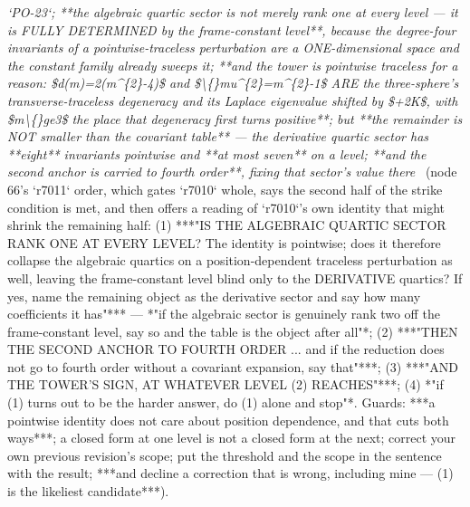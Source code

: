 \begin{description}
\textit{`PO-23`; **the algebraic quartic sector is not merely rank one at every level --- it is FULLY DETERMINED by the frame-constant level**, because the degree-four invariants of a pointwise-traceless perturbation are a ONE-dimensional space and the constant family already sweeps it;  **and the tower is pointwise traceless for a reason: \$d(m)=2(m\textasciicircum{}\{2\}-4)\$ and \$\textbackslash\{\}mu\textasciicircum{}\{2\}=m\textasciicircum{}\{2\}-1\$ ARE the three-sphere's transverse-traceless degeneracy and its Laplace eigenvalue shifted by \$+2K\$, with \$m\textbackslash\{\}ge3\$ the place that degeneracy first turns positive**;  but **the remainder is NOT smaller than the covariant table** --- the derivative quartic sector has **eight** invariants pointwise and **at most seven** on a level; **and the second anchor is carried to fourth order**, fixing that sector's value there} \ (node 66's `r7011` order, which gates `r7010` whole, says the second half of the strike condition is met, and then offers a reading of `r7010`'s own identity that might shrink the remaining half: (1) ***"IS THE ALGEBRAIC QUARTIC SECTOR RANK ONE AT EVERY LEVEL? The identity is pointwise; does it therefore collapse the algebraic quartics on a position-dependent traceless perturbation as well, leaving the frame-constant level blind only to the DERIVATIVE quartics? If yes, name the remaining object as the derivative sector and say how many coefficients it has"*** ---  *"if the algebraic sector is genuinely rank two off the frame-constant level, say so and the table is the object after all"*; (2) ***"THEN THE SECOND ANCHOR TO FOURTH ORDER ... and if the reduction does not go to fourth order without a covariant expansion, say that"***; (3) ***"AND THE TOWER'S SIGN, AT WHATEVER LEVEL (2) REACHES"***; (4) *"if (1) turns out to be the harder answer, do (1) alone and stop"*.  Guards: ***a pointwise identity does not care about position dependence, and that cuts both ways***; a closed form at one level is not a closed form at the next; correct your own previous revision's scope; put the threshold and the scope in the sentence with the result;  ***and decline a correction that is wrong, including mine --- (1) is the likeliest candidate***). 

\end{description}
